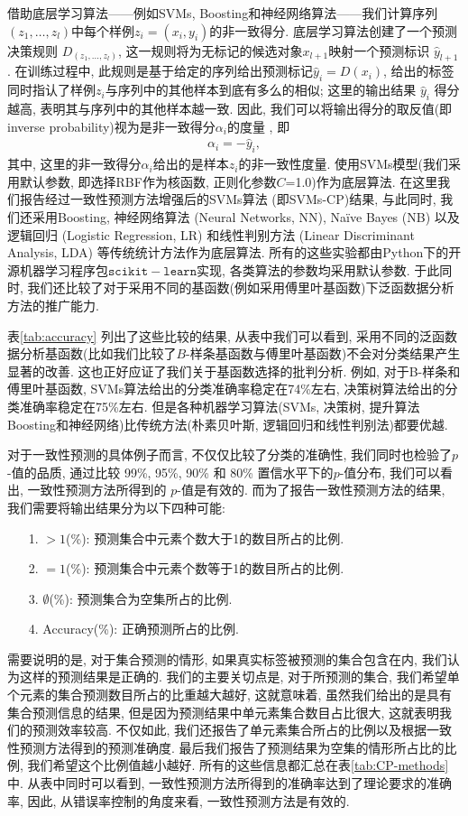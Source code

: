 借助底层学习算法——例如SVMs, Boosting和神经网络算法——我们计算序列$(z_1,\ldots,z_{l})$中每个样例$z_i=(x_{i},y_{i})$的非一致得分. 底层学习算法创建了一个预测决策规则 $D_{(z_1,\ldots,z_l)}$,  这一规则将为无标记的候选对象$x_{l+1}$映射一个预测标识 $\hat{y}_{l+1}$. 在训练过程中, 此规则是基于给定的序列给出预测标记$\hat{y}_{i} = D(x_{i})$, 给出的标签同时指认了样例$z_i$与序列中的其他样本到底有多么的相似; 这里的输出结果 $\hat{y}_{i}$ 得分越高, 表明其与序列中的其他样本越一致. 因此, 我们可以将输出得分的取反值(即 inverse probability)视为是非一致得分$\alpha_{i}$的度量 \citep{Aleksandrova2021}, 即
\begin{align}
\alpha_{i} = -\hat{y}_{i},
\end{align}
其中, 这里的非一致得分$\alpha_{i}$给出的是样本$z_{i}$的非一致性度量. 使用SVMs模型(我们采用默认参数, 即选择RBF作为核函数, 正则化参数$C$=1.0)作为底层算法. 在这里我们报告经过一致性预测方法增强后的SVMs算法 (即SVMs-CP)结果, 与此同时, 我们还采用Boosting, 神经网络算法 (Neural Networks, NN), Na{\"i}ve Bayes (NB) 以及逻辑回归 (Logistic Regression, LR) 和线性判别方法 (Linear Discriminant Analysis, LDA) 等传统统计方法作为底层算法. 所有的这些实验都由Python下的开源机器学习程序包$\mathtt{scikit-learn}$实现, 各类算法的参数均采用默认参数. 于此同时, 我们还比较了对于采用不同的基函数(例如采用傅里叶基函数)下泛函数据分析方法的推广能力. 

表\ref{tab:accuracy} 列出了这些比较的结果, 从表中我们可以看到, 采用不同的泛函数据分析基函数(比如我们比较了$B$-样条基函数与傅里叶基函数)不会对分类结果产生显著的改善. 这也正好应证了我们关于基函数选择的批判分析. 例如, 对于B-样条和傅里叶基函数, SVMs算法给出的分类准确率稳定在74\%左右, 决策树算法给出的分类准确率稳定在75\%左右. 但是各种机器学习算法(SVMs, 决策树, 提升算法Boosting和神经网络)比传统方法(朴素贝叶斯, 逻辑回归和线性判别法)都要优越.

对于一致性预测的具体例子而言, 不仅仅比较了分类的准确性, 我们同时也检验了$p$-值的品质, 通过比较 99\%, 95\%, 90\% 和 80\% 置信水平下的$p$-值分布, 我们可以看出, 一致性预测方法所得到的 $p$-值是有效的. 而为了报告一致性预测方法的结果, 我们需要将输出结果分为以下四种可能: 
\begin{enumerate}
\item[1.] $>1$(\%): 预测集合中元素个数大于1的数目所占的比例.
\item[2.] $=1$(\%): 预测集合中元素个数等于1的数目所占的比例.
\item[3.] $\emptyset$(\%): 预测集合为空集所占的比例.
\item[4.] Accuracy(\%): 正确预测所占的比例.
\end{enumerate}
需要说明的是, 对于集合预测的情形, 如果真实标签被预测的集合包含在内, 我们认为这样的预测结果是正确的. 我们的主要关切点是, 对于所预测的集合, 我们希望单个元素的集合预测数目所占的比重越大越好, 这就意味着, 虽然我们给出的是具有集合预测信息的结果, 但是因为预测结果中单元素集合数目占比很大, 这就表明我们的预测效率较高. 不仅如此, 我们还报告了单元素集合所占的比例以及根据一致性预测方法得到的预测准确度. 最后我们报告了预测结果为空集的情形所占比的比例, 我们希望这个比例值越小越好. 所有的这些信息都汇总在表\ref{tab:CP-methods}中. 从表中同时可以看到, 一致性预测方法所得到的准确率达到了理论要求的准确率, 因此, 从错误率控制的角度来看, 一致性预测方法是有效的.

